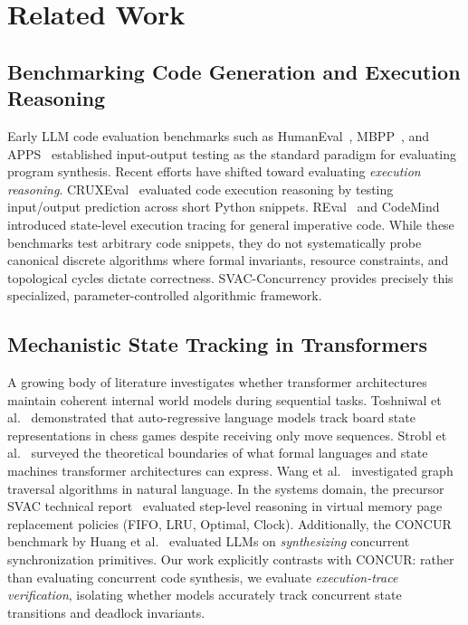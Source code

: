 \documentclass[conference]{IEEEtran}
\begin{document}
\section{Related Work}
\label{sec:related}

\subsection{Benchmarking Code Generation and Execution Reasoning}

Early LLM code evaluation benchmarks such as HumanEval~\cite{chen2021codex},
MBPP~\cite{austin2021program}, and APPS~\cite{hendrycks2021apps} established
input-output testing as the standard paradigm for evaluating program synthesis. Recent
efforts have shifted toward evaluating \emph{execution reasoning}. CRUXEval~\cite{gu2024cruxeval}
evaluated code execution reasoning by testing input/output prediction across short Python
snippets. REval~\cite{chen2025reval} and CodeMind~\cite{liu2024codemind} introduced
state-level execution tracing for general imperative code. While these benchmarks test
arbitrary code snippets, they do not systematically probe canonical discrete algorithms
where formal invariants, resource constraints, and topological cycles dictate
correctness. SVAC-Concurrency provides precisely this specialized, parameter-controlled
algorithmic framework.

\subsection{Mechanistic State Tracking in Transformers}

A growing body of literature investigates whether transformer architectures maintain
coherent internal world models during sequential tasks. Toshniwal et al.~\cite{toshniwal2022chess}
demonstrated that auto-regressive language models track board state representations in
chess games despite receiving only move sequences. Strobl et al.~\cite{strobl2024transformers}
surveyed the theoretical boundaries of what formal languages and state machines
transformer architectures can express. Wang et al.~\cite{wang2023graph} investigated
graph traversal algorithms in natural language. In the systems domain, the precursor SVAC
technical report~\cite{anon2024svac} evaluated step-level reasoning in virtual memory
page replacement policies (FIFO, LRU, Optimal, Clock). Additionally, the CONCUR
benchmark by Huang et al.~\cite{huang2026concur} evaluated LLMs on \emph{synthesizing}
concurrent synchronization primitives. Our work explicitly contrasts with CONCUR: rather
than evaluating concurrent code synthesis, we evaluate \emph{execution-trace
verification}, isolating whether models accurately track concurrent state transitions and
deadlock invariants.
\end{document}
